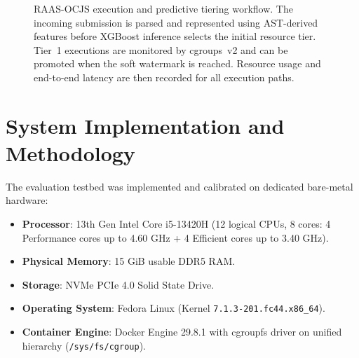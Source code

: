 \documentclass[conference]{IEEEtran}
\begin{document}
\begin{figure}[!t]
{%
}
\caption{RAAS-OCJS execution and predictive tiering workflow. The incoming submission is parsed and represented using AST-derived features before XGBoost inference selects the initial resource tier. Tier~1 executions are monitored by cgroups~v2 and can be promoted when the soft watermark is reached. Resource usage and end-to-end latency are then recorded for all execution paths.}
\label{fig:raas_architecture}
\end{figure}

\section{System Implementation and Methodology}



The evaluation testbed was implemented and calibrated on dedicated bare-metal hardware:
\begin{itemize}
    \item \textbf{Processor}: 13th Gen Intel Core i5-13420H (12 logical CPUs, 8 cores: 4 Performance cores up to 4.60 GHz + 4 Efficient cores up to 3.40 GHz).
    \item \textbf{Physical Memory}: 15 GiB usable DDR5 RAM.
    \item \textbf{Storage}: NVMe PCIe 4.0 Solid State Drive.
    \item \textbf{Operating System}: Fedora Linux (Kernel \texttt{7.1.3-201.fc44.x86\_64}).
    \item \textbf{Container Engine}: Docker Engine 29.8.1 with cgroupfs driver on unified hierarchy (\texttt{/sys/fs/cgroup}).
\end{itemize}
\end{document}
